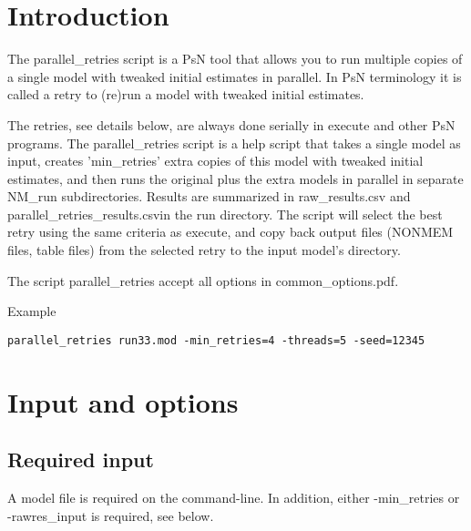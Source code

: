 



\maketitle
\newcommand{\guidetoolname}{parallel\_retries}


\section{Introduction}
The parallel\_retries script is a PsN tool that allows you to run 
multiple copies of
a single model with tweaked initial estimates in parallel.
In PsN terminology it is called a retry to (re)run a model with tweaked 
initial estimates.

The retries, see details below, 
are always done serially in execute and other PsN programs. 
The parallel\_retries script is a help script that takes a single model 
as input, creates 'min\_retries' extra copies of this model 
with tweaked initial estimates, and then runs the original plus 
the extra models in parallel in separate NM\_run subdirectories. 
Results are summarized in raw\_results.csv and parallel\_retries\_results.csvin the run directory. 
The script will select the best retry using the same criteria as execute,
and copy back output files (NONMEM files, table files) from the selected retry to the
input model's directory.

The script parallel\_retries accept all
options in common\_options.pdf. 

Example
\begin{verbatim}
parallel_retries run33.mod -min_retries=4 -threads=5 -seed=12345
\end{verbatim}

\section{Input and options}
\subsection{Required input}
A model file is required on the command-line. 
In addition, either -min\_retries or -rawres\_input is required, see below.

